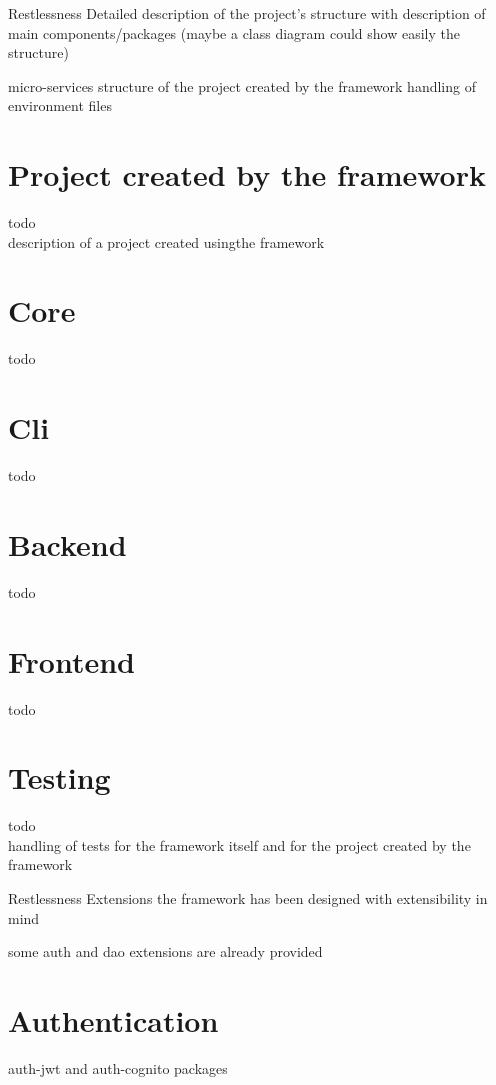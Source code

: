 \begin{mainmatter}
\begin{chapter}{Restlessness}
        Detailed description of the project's structure with description of main components/packages
        (maybe a class diagram could show easily the structure)

        micro-services structure of the project created by the framework
        handling of environment files

        \section{Project created by the framework}
        todo\\
        description of a project created usingthe framework

        \section{Core}
        todo

        \section{Cli}
        todo

        \section{Backend}
        todo

        \section{Frontend}
        todo

        \section{Testing}
        todo\\
        handling of tests for the framework itself and for the project created by the
        framework

    \end{chapter}


    \begin{chapter}{Restlessness Extensions}
        the framework has been designed with extensibility in mind

        some auth and dao extensions are already provided

        \section{Authentication}
        auth-jwt and auth-cognito packages


\end{chapter}
\end{mainmatter}
